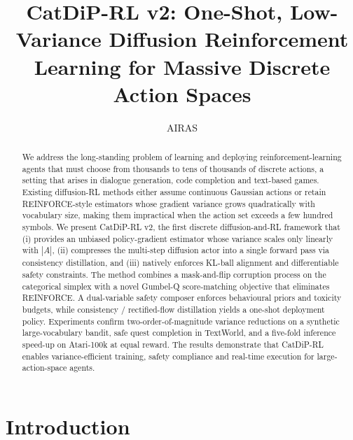 \documentclass{article} %
\title{CatDiP-RL v2: One-Shot, Low-Variance Diffusion Reinforcement Learning for Massive Discrete Action Spaces}
\author{AIRAS}
\begin{document}
\maketitle

\begin{abstract}
We address the long-standing problem of learning and deploying reinforcement-learning agents that must choose from thousands to tens of thousands of discrete actions, a setting that arises in dialogue generation, code completion and text-based games. Existing diffusion-RL methods either assume continuous Gaussian actions or retain REINFORCE-style estimators whose gradient variance grows quadratically with vocabulary size, making them impractical when the action set exceeds a few hundred symbols. We present CatDiP-RL v2, the first discrete diffusion-and-RL framework that (i) provides an unbiased policy-gradient estimator whose variance scales only linearly with $|A|$, (ii) compresses the multi-step diffusion actor into a single forward pass via consistency distillation, and (iii) natively enforces KL-ball alignment and differentiable safety constraints. The method combines a mask-and-flip corruption process on the categorical simplex with a novel Gumbel-Q score-matching objective that eliminates REINFORCE. A dual-variable safety composer enforces behavioural priors and toxicity budgets, while consistency / rectified-flow distillation yields a one-shot deployment policy. Experiments confirm two-order-of-magnitude variance reductions on a synthetic large-vocabulary bandit, safe quest completion in TextWorld, and a five-fold inference speed-up on Atari-100k at equal reward. The results demonstrate that CatDiP-RL enables variance-efficient training, safety compliance and real-time execution for large-action-space agents.
\end{abstract}

\section{Introduction}
\label{sec:intro}
\end{document}
